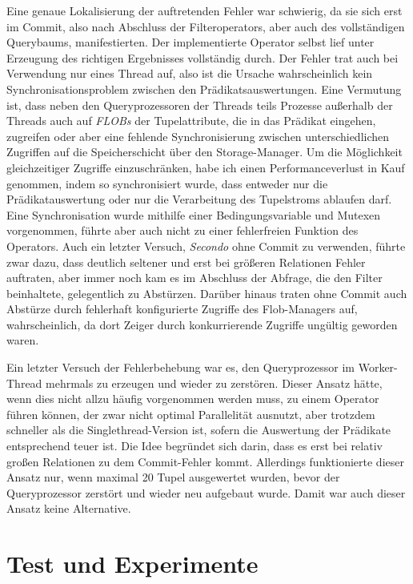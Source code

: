 \documentclass[a4paper,12pt,twoside]{article}
\newcommand{\Fb}[1]{\textit{#1}} %
\begin{document}
Eine genaue Lokalisierung der auftretenden Fehler war schwierig, da sie sich erst im Commit, also nach Abschluss der Filteroperators, aber auch des vollständigen Querybaums, manifestierten. Der implementierte Operator selbst lief unter Erzeugung des richtigen Ergebnisses vollständig durch. Der Fehler trat auch bei Verwendung nur eines Thread auf, also ist die Ursache wahrscheinlich kein Synchronisationsproblem zwischen den Prädikatsauswertungen. Eine Vermutung ist, dass neben den Queryprozessoren der Threads teils Prozesse außerhalb der Threads auch auf \Fb{FLOBs} der Tupelattribute, die in das Prädikat eingehen, zugreifen oder aber eine fehlende Synchronisierung zwischen unterschiedlichen Zugriffen auf die Speicherschicht über den Storage-Manager. Um die Möglichkeit gleichzeitiger Zugriffe einzuschränken, habe ich einen Performanceverlust in Kauf genommen, indem so synchronisiert wurde, dass entweder nur die Prädikatauswertung oder nur die Verarbeitung des Tupelstroms ablaufen darf. Eine Synchronisation wurde mithilfe einer Bedingungsvariable und Mutexen vorgenommen, führte aber auch nicht zu einer fehlerfreien Funktion des Operators. Auch ein letzter Versuch, \Fb{Secondo} ohne Commit zu verwenden, führte zwar dazu, dass deutlich seltener und erst bei größeren Relationen Fehler auftraten, aber immer noch kam es im Abschluss der Abfrage, die den Filter beinhaltete, gelegentlich zu Abstürzen. Darüber hinaus traten ohne Commit auch Abstürze durch fehlerhaft konfigurierte Zugriffe des Flob-Managers auf, wahrscheinlich, da dort Zeiger durch konkurrierende Zugriffe ungültig geworden waren.

Ein letzter Versuch der Fehlerbehebung war es, den Queryprozessor im Worker-Thread mehrmals zu erzeugen und wieder zu zerstören. Dieser Ansatz hätte, wenn dies nicht allzu häufig vorgenommen werden muss, zu einem Operator führen können, der zwar nicht optimal Parallelität ausnutzt, aber trotzdem schneller als die Singlethread-Version ist, sofern die Auswertung der Prädikate entsprechend teuer ist. Die Idee begründet sich darin, dass es erst bei relativ großen Relationen zu dem Commit-Fehler kommt. Allerdings funktionierte dieser Ansatz nur, wenn maximal 20 Tupel ausgewertet wurden, bevor der Queryprozessor zerstört und wieder neu aufgebaut wurde. Damit war auch dieser Ansatz keine Alternative.

\section{Test und Experimente} 
\label{te}
\end{document}

